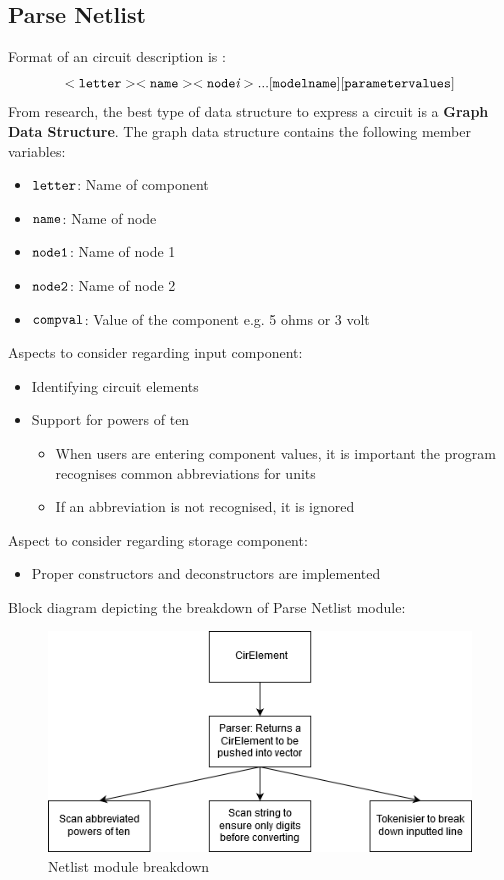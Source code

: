 \documentclass[12pt,a4paper]{article}
\begin{document}
\subsection{Parse Netlist}

Format of an circuit description is \cite{spice}:
		$$\tt{<letter><name><node\textit{i}> ... [modelname][parametervalues]}$$
From research, the best type of data structure to express a circuit is a \textbf{Graph Data Structure}.
The graph data structure contains the following member variables:
\begin{itemize}
	\item $\tt{letter}$: Name of component 
	\item $\tt{name}$: Name of node 
	\item $\tt{node1}$: Name of node 1
	\item $\tt{node2}$: Name of node 2
	\item $\tt{compval}$: Value of the component e.g. 5 ohms or 3 volt
\end{itemize}

\par
Aspects to consider regarding input component:
\begin{itemize}
	\item Identifying circuit elements
	\item Support for powers of ten
	\begin{itemize}
		\item When users are entering component values, it is important the program recognises common abbreviations for units
		\item If an abbreviation is not recognised, it is ignored
	\end{itemize} 
\end{itemize}
Aspect to consider regarding storage component:
\begin{itemize}
	\item Proper constructors and deconstructors are implemented
\end{itemize}

\pagebreak
Block diagram depicting the breakdown of Parse Netlist module:
\begin{figure}[h]
    \centering
    \includegraphics[scale=0.75]{Netlist breakdown}
    \caption{Netlist module breakdown}
    \label{fig:Netlist breakdown}
\end{figure}
\end{document}
